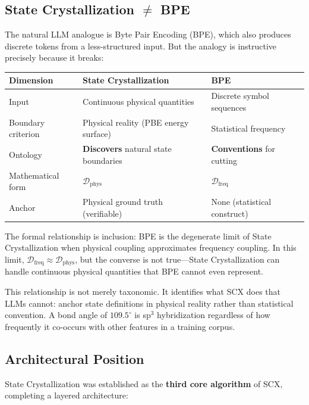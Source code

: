 \documentclass[12pt,a4paper]{ctexart}
\begin{document}
\subsection{State Crystallization $\neq$ BPE}

The natural LLM analogue is Byte Pair Encoding (BPE), which also produces discrete tokens from a less-structured input. But the analogy is instructive precisely because it breaks:

\begin{table}[htbp]
\centering
\begin{tabular}{@{}lll@{}}
\toprule
Dimension & State Crystallization & BPE \\
\midrule
Input & Continuous physical quantities & Discrete symbol sequences \\
Boundary criterion & Physical reality (PBE energy surface) & Statistical frequency \\
Ontology & \textbf{Discovers} natural state boundaries & \textbf{Conventions} for cutting \\
Mathematical form & $\mathcal{D}_{\text{phys}}$ & $\mathcal{D}_{\text{freq}}$ \\
Anchor & Physical ground truth (verifiable) & None (statistical construct) \\
\bottomrule
\end{tabular}
\end{table}

The formal relationship is inclusion: BPE is the degenerate limit of State Crystallization when physical coupling approximates frequency coupling. In this limit, $\mathcal{D}_{\text{freq}} \approx \mathcal{D}_{\text{phys}}$, but the converse is not true—State Crystallization can handle continuous physical quantities that BPE cannot even represent.

This relationship is not merely taxonomic. It identifies what SCX does that LLMs cannot: anchor state definitions in physical reality rather than statistical convention. A bond angle of $109.5^\circ$ is sp$^3$ hybridization regardless of how frequently it co-occurs with other features in a training corpus.

\subsection{Architectural Position}

State Crystallization was established as the \textbf{third core algorithm} of SCX, completing a layered architecture:
\end{document}
